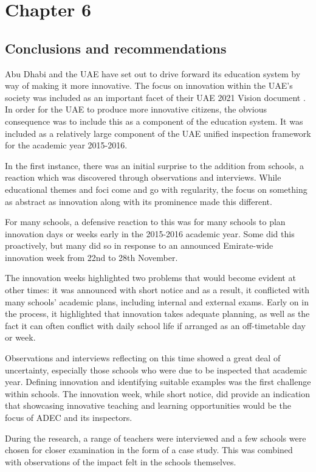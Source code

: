 \section{Chapter 6}
\subsection{Conclusions and recommendations}
Abu Dhabi and the UAE have set out to drive forward its education system by way of making it more innovative. The focus on innovation within the UAE’s society was included as an important facet of their UAE 2021 Vision document \cite{UAEGovernment2012}. In order for the UAE to produce more innovative citizens, the obvious consequence was to include this as a component of the education system. It was included as a relatively large component of the UAE unified inspection framework for the academic year 2015-2016.

In the first instance, there was an initial surprise to the addition from schools, a reaction which was discovered through observations and interviews. While educational themes and foci come and go with regularity, the focus on something as abstract as innovation along with its prominence made this different.

For many schools, a defensive reaction to this was for many schools to plan innovation days or weeks early in the 2015-2016 academic year. Some did this proactively, but many did so in response to an announced Emirate-wide innovation week from 22nd to 28th November. 

The innovation weeks highlighted two problems that would become evident at other times: it was announced with short notice and as a result, it conflicted with many schools’ academic plans, including internal and external exams.
Early on in the process, it highlighted that innovation takes adequate planning, as well as the fact it can often conflict with daily school life if arranged as an off-timetable day or week.

Observations and interviews reflecting on this time showed a great deal of uncertainty, especially those schools who were due to be inspected that academic year. Defining innovation and identifying suitable examples was the first challenge within schools. The innovation week, while short notice, did provide an indication that showcasing innovative teaching and learning opportunities would be the focus of ADEC and its inspectors.

During the research, a range of teachers were interviewed and a few schools were chosen for closer examination in the form of a case study. This was combined with observations of the impact felt in the schools themselves.

